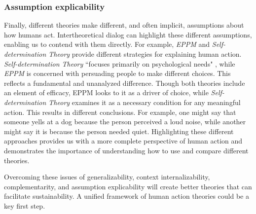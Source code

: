 \documentclass[12 pt]{article}
\begin{document}
\subsubsection{Assumption explicability}
Finally, different theories make different, and often implicit, assumptions about how humans act. Intertheoretical dialog can highlight these different assumptions, enabling us to contend with them directly. For example, \textit{EPPM} and \textit{Self-determination Theory} provide different strategies for explaining human action. \textit{Self-determination Theory} ``focuses primarily on psychological needs" \parencite[][p. 57]{Ryan2000}, while \textit{EPPM} is concerned with persuading people to make different choices. This reflects a fundamental and unanalyzed difference. Though both theories include an element of efficacy, EPPM looks to it as a driver of choice, while \textit{Self-determination Theory} examines it as a necessary condition for any meaningful action.  This results in different conclusions. For example, one might say that someone yells at a dog because the person perceived a loud noise,  while another might say it is because the person needed quiet. Highlighting these different approaches provides us with a more complete perspective of human action and demonstrates the importance of understanding how to use and compare different theories.

Overcoming these issues of generalizability, context internalizability, complementarity, and assumption explicability will create better theories that can facilitate sustainability. A unified framework of human action theories could be a key first step. 
\end{document}
